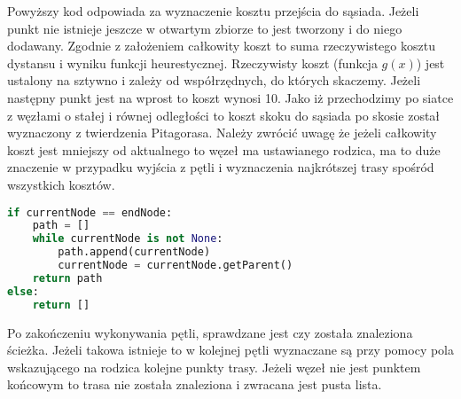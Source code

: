 Powyższy kod odpowiada za wyznaczenie kosztu przejścia do sąsiada. Jeżeli punkt nie istnieje jeszcze w otwartym zbiorze 
to jest tworzony i do niego dodawany. Zgodnie z założeniem całkowity koszt to suma rzeczywistego kosztu dystansu i wyniku funkcji heurestycznej. 
Rzeczywisty koszt (funkcja $g(x)$) jest ustalony na sztywno i zależy od współrzędnych, do których skaczemy. 
Jeżeli następny punkt jest na wprost to koszt wynosi 10.
Jako iż przechodzimy po siatce z węzłami o stałej i równej odległości to koszt skoku do sąsiada po skosie został wyznaczony z twierdzenia Pitagorasa. 
Należy zwrócić uwagę że jeżeli całkowity koszt jest mniejszy od aktualnego to węzeł ma ustawianego rodzica, ma to duże znaczenie w przypadku wyjścia z pętli 
i wyznaczenia najkrótszej trasy spośród wszystkich kosztów. 

\begin{lstlisting}[language=Python,caption=Przygotowanie danych,label={kodPython3}]
if currentNode == endNode:
    path = []
    while currentNode is not None:
        path.append(currentNode)
        currentNode = currentNode.getParent()
    return path
else:
    return []
\end{lstlisting}

Po zakończeniu wykonywania pętli, sprawdzane jest czy została znaleziona ścieżka. Jeżeli takowa istnieje to w kolejnej pętli 
wyznaczane są przy pomocy pola wskazującego na rodzica kolejne punkty trasy. 
Jeżeli węzeł nie jest punktem końcowym to trasa nie została znaleziona i zwracana jest pusta lista.
